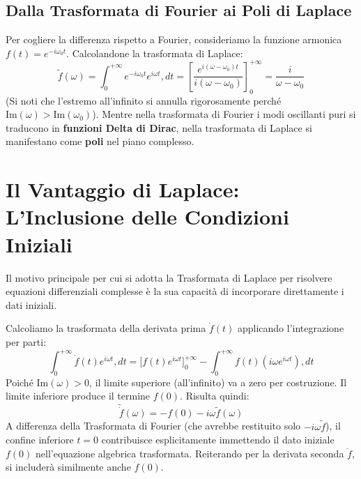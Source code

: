 \subsection{Dalla Trasformata di Fourier ai Poli di Laplace}
Per cogliere la differenza rispetto a Fourier, consideriamo la funzione armonica $f(t) = e^{-i\omega_0 t}$. Calcolandone la trasformata di Laplace:
\begin{equation}
\tilde{f}(\omega) = \int_0^{+\infty} e^{-i\omega_0 t} e^{i\omega t} , dt = \left[ \frac{e^{i(\omega - \omega_0)t}}{i(\omega - \omega_0)} \right]_0^{+\infty} = \frac{i}{\omega - \omega_0}
\end{equation}
(Si noti che l'estremo all'infinito si annulla rigorosamente perché $\text{Im}(\omega) > \text{Im}(\omega_0)$).
Mentre nella trasformata di Fourier i modi oscillanti puri si traducono in \textbf{funzioni Delta di Dirac}, nella trasformata di Laplace si manifestano come \textbf{poli} nel piano complesso.

\section{Il Vantaggio di Laplace: L'Inclusione delle Condizioni Iniziali}

Il motivo principale per cui si adotta la Trasformata di Laplace per risolvere equazioni differenziali complesse è la sua capacità di incorporare direttamente i dati iniziali.

Calcoliamo la trasformata della derivata prima $\dot{f}(t)$ applicando l'integrazione per parti:
\begin{equation}
\int_0^{+\infty} \dot{f}(t) e^{i\omega t} , dt = \Big[ f(t) e^{i\omega t} \Big]_0^{+\infty} - \int_0^{+\infty} f(t) (i\omega e^{i\omega t}) , dt
\end{equation}
Poiché $\text{Im}(\omega) > 0$, il limite superiore (all'infinito) va a zero per costruzione. Il limite inferiore produce il termine $f(0)$. Risulta quindi:
\begin{equation}
\tilde{\dot{f}}(\omega) = -f(0) - i\omega \tilde{f}(\omega)
\end{equation}
A differenza della Trasformata di Fourier (che avrebbe restituito solo $-i\omega \tilde{f}$), il confine inferiore $t=0$ contribuisce esplicitamente immettendo il dato iniziale $f(0)$ nell'equazione algebrica trasformata. Reiterando per la derivata seconda $\ddot{f}$, si includerà similmente anche $\dot{f}(0)$.

